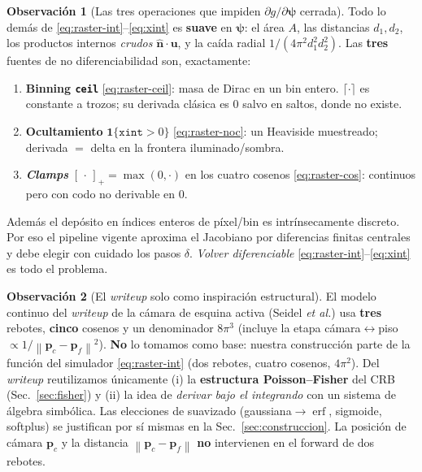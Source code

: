 \documentclass[11pt,a4paper]{article}
\theoremstyle{plain}
\theoremstyle{definition}
\newtheorem{remark}{Observaci\'on}
\newcommand{\vect}[1]{\boldsymbol{#1}}
\newcommand{\erf}{\operatorname{erf}}
\newcommand{\norm}[1]{\left\lVert #1 \right\rVert}
\begin{document}
\begin{remark}[Las tres operaciones que impiden $\partial g/\partial\vect{\psi}$ cerrada]
\label{rem:tres}
Todo lo dem\'as de \eqref{eq:raster-int}--\eqref{eq:xint} es \textbf{suave} en
$\vect{\psi}$: el \'area $A$, las distancias $d_1,d_2$, los productos internos
\emph{crudos} $\hat{\vect n}\!\cdot\!\vect u$, y la ca\'ida radial
$1/(4\pi^2 d_1^2 d_2^2)$. Las \textbf{tres} fuentes de no diferenciabilidad son,
exactamente:
\begin{enumerate}[nosep]
    \item \textbf{Binning \texttt{ceil}} \eqref{eq:raster-ceil}: masa de Dirac en
    un bin entero. $\lceil\cdot\rceil$ es constante a trozos; su derivada
    cl\'asica es $0$ salvo en saltos, donde no existe.
    \item \textbf{Ocultamiento} $\mathbf 1\{\texttt{xint}>0\}$
    \eqref{eq:raster-noc}: un Heaviside muestreado; derivada $=$ delta en la
    frontera iluminado/sombra.
    \item \textbf{\emph{Clamps}} $[\,\cdot\,]_+=\max(0,\cdot)$ en los cuatro
    cosenos \eqref{eq:raster-cos}: continuos pero con codo no derivable en $0$.
\end{enumerate}
Adem\'as el dep\'osito en \'indices enteros de p\'ixel/bin es intr\'insecamente
discreto. Por eso el pipeline vigente aproxima el Jacobiano por diferencias
finitas centrales y debe elegir con cuidado los pasos $\delta$. \emph{Volver
diferenciable} \eqref{eq:raster-int}--\eqref{eq:xint} es todo el problema.
\end{remark}

\begin{remark}[El \emph{writeup} solo como inspiraci\'on estructural]
\label{rem:writeup}
El modelo continuo del \emph{writeup} de la c\'amara de esquina activa (Seidel
\emph{et al.}) usa \textbf{tres} rebotes, \textbf{cinco} cosenos y un denominador
$8\pi^3$ (incluye la etapa c\'amara$\leftrightarrow$piso $\propto1/\norm{\vect
p_c-\vect p_f}^2$). \textbf{No} lo tomamos como base: nuestra construcci\'on parte
de la funci\'on del simulador \eqref{eq:raster-int} (dos rebotes, cuatro cosenos,
$4\pi^2$). Del \emph{writeup} reutilizamos \'unicamente (i) la \textbf{estructura
Poisson--Fisher} del CRB (Sec.~\ref{sec:fisher}) y (ii) la idea de \emph{derivar
bajo el integrando} con un sistema de \'algebra simb\'olica. Las elecciones de
suavizado (gaussiana$\to\erf$, sigmoide, softplus) se justifican por s\'i mismas
en la Sec.~\ref{sec:construccion}. La posici\'on de c\'amara $\vect{p}_c$ y la
distancia $\norm{\vect p_c-\vect p_f}$ \textbf{no} intervienen en el forward de
dos rebotes.
\end{remark}
\end{document}
